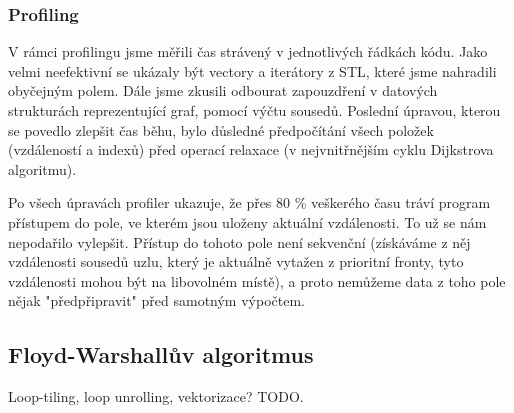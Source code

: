 \documentclass[a4paper,11pt]{article}
\begin{document}
\subsubsection{Profiling}
V rámci profilingu jsme měřili čas strávený v jednotlivých řádkách kódu. Jako velmi neefektivní se ukázaly být vectory a iterátory z STL, které jsme nahradili obyčejným polem. Dále jsme zkusili odbourat zapouzdření v datových strukturách reprezentující graf, pomocí výčtu sousedů. Poslední úpravou, kterou se povedlo zlepšit čas běhu, bylo důsledné předpočítání všech položek (vzdáleností a indexů) před operací relaxace (v nejvnitřnějším cyklu Dijk\-strova algoritmu).
\par
Po všech úpravách profiler ukazuje, že přes 80 \% veškerého času tráví program přístupem do pole, ve kterém jsou uloženy aktuální vzdálenosti. To už se nám nepodařilo vylepšit. Přístup do tohoto pole není sekvenční (získáváme z něj vzdálenosti sousedů uzlu, který je aktuálně vytažen z prioritní fronty, tyto vzdálenosti mohou být na libovolném místě), a proto nemůžeme data z toho pole nějak "předpřipravit" před samotným výpočtem.

\subsection{Floyd-Warshallův algoritmus}
Loop-tiling, loop unrolling, vektorizace? TODO.
\end{document}
